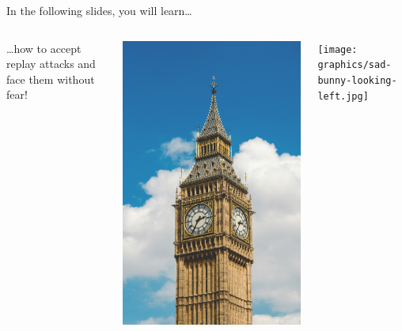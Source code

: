 \begin{frame}{In the following slides, you will learn…}
\begin{columns}[fullwidth]
\begin{column}{.58\linewidth}
    \vspace{2em}
    …how to accept replay attacks and face them without fear!
  \end{column}
  \begin{column}{.20\linewidth}
    \includegraphics[width=\linewidth]{graphics/big-ben.jpg}
    \vspace{0.4cm}
  \end{column}
  \begin{column}{.20\linewidth}
    \vspace{1.6cm}
    \texttt{[image: graphics/sad-bunny-looking-left.jpg]}
  \end{column}
\end{columns}
\end{frame}



